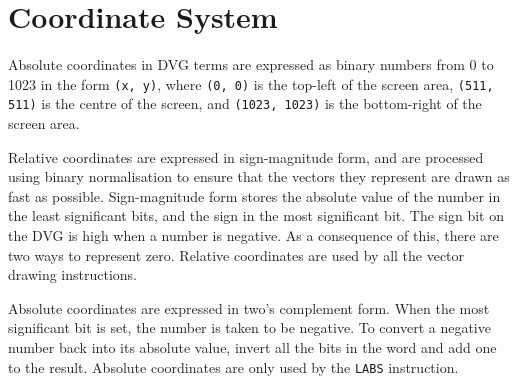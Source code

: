 \section{Coordinate System}
Absolute coordinates in DVG terms are expressed as binary numbers from 0 to
1023 in the form {\tt (x, y)}, where {\tt (0, 0)} is the top-left of the screen
area, {\tt (511, 511)} is the centre of the screen, and {\tt (1023, 1023)} is
the bottom-right of the screen area.

Relative coordinates are expressed in sign-magnitude form, and are processed
using binary normalisation to ensure that the vectors they represent are drawn
as fast as possible. Sign-magnitude form stores the absolute value of the
number in the least significant bits, and the sign in the most significant bit.
The sign bit on the DVG is high when a number is negative. As a consequence of
this, there are two ways to represent zero. Relative coordinates are used by
all the vector drawing instructions.

Absolute coordinates are expressed in two's complement form. When the most
significant bit is set, the number is taken to be negative. To convert a
negative number back into its absolute value, invert all the bits in the word
and add one to the result. Absolute coordinates are only used by the {\tt LABS}
instruction.
